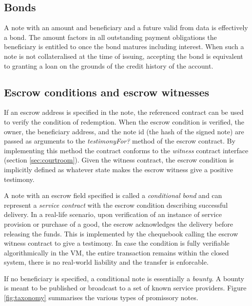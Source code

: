 \documentclass[a4paper,10pt]{article}
\newcommand\gloss[1]{\emph{\gls{#1}}}
\begin{document}
\subsection{Bonds}

A note with an amount and beneficiary and a future valid from data is effectively a bond.
The amount factors in all outstanding payment obligations the beneficiary is entitled to
once the bond matures including interest. When such a note is not collateralised at the time of issuing,
accepting the bond is equivalent to granting a loan on the grounds of the credit history of the account.

\subsection{Escrow conditions and escrow witnesses}

If an escrow address is specified in the note, the referenced contract can be used to verify the condition
of redemption. When the escrow condition is verified, the owner, the beneficiary address, and
the note id (the hash of the signed note) are passed as arguments to the {\gloss{testimonyFor?}} method
of the escrow contract. By implementing this method the contract conforms to the \gloss{witness} contract
 interface
(section \ref{sec:courtroom}). Given the witness contract, the escrow condition is implicitly defined
as whatever state makes the escrow witness give a positive testimony.

A note with an escrow field specified is called a \gloss{conditional bond} and
can represent a \gloss{service contract} with the escrow condition describing successful delivery.
In a real-life scenario, upon verification of an instance of service provision or purchase of a good,
the escrow acknowledges the delivery before releasing the funds.
This is implemented by the chequebook calling the escrow witness contract
to give a testimony. In case the condition is fully verifiable algorithmically in the VM,
the entire transaction remains within the closed system, there is no real-world liability and the transfer
is enforcable.

If no beneficiary is specified, a conditional note is essentially a \gloss{bounty}.
A bounty is meant to be published or broadcast to a set of known service providers.
Figure \ref{fig:taxonomy} summarises the various types of promissory notes.
\end{document}
